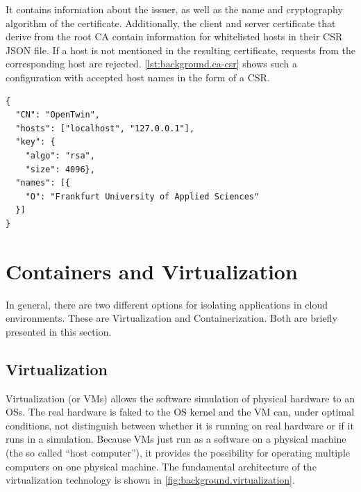 It contains information about the issuer, as well as the name and cryptography algorithm of the certificate.
Additionally, the client and server certificate that derive from the root \ac{CA} contain information for whitelisted hosts in their \ac{CSR} JSON file. If a host is not mentioned in the resulting certificate, requests from the corresponding host are rejected.
\autoref{lst:background.ca-csr} shows such a configuration with accepted host names in the form of a \ac{CSR}.

\begin{lstlisting}[label=lst:background.ca-csr, caption={Example of meta data in form of \ac{CSR} configuration. \enquote{CN} is the certificate name. \enquote{hosts} describes the accepted hostnames, \enquote{key} describes information about the cryptography algorithm, \enquote{names} contains meta data of the organization}]
{
  "CN": "OpenTwin",
  "hosts": ["localhost", "127.0.0.1"],
  "key": {
    "algo": "rsa",
    "size": 4096},
  "names": [{
    "O": "Frankfurt University of Applied Sciences"
  }]
}
\end{lstlisting}



\section{Containers and Virtualization}
In general, there are two different options for isolating applications in cloud environments. These are Virtualization and Containerization. Both are briefly presented in this section.

\subsection{Virtualization}
Virtualization (or \acp{VM}) allows the software simulation of physical hardware to an \acp{OS}. The real hardware is faked to the \ac{OS} kernel and the \ac{VM} can, under optimal conditions, not distinguish between whether it is running on real hardware or if it runs in a simulation. Because \acp{VM} just run as a software on a physical machine (the so called \enquote{host computer}), it provides the possibility for operating multiple computers on one physical machine.
The fundamental architecture of the virtualization technology is shown in \autoref{fig:background.virtualization}.

